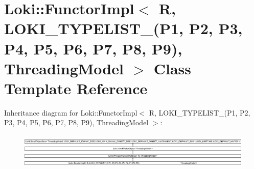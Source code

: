 \hypertarget{classLoki_1_1FunctorImpl_3_01R_00_01LOKI__TYPELIST__9_07P1_00_01P2_00_01P3_00_01P4_00_01P5_00_01493beb80705da8521e05ba7a51e552dd}{}\section{Loki\+:\+:Functor\+Impl$<$ R, L\+O\+K\+I\+\_\+\+T\+Y\+P\+E\+L\+I\+S\+T\+\_(P1, P2, P3, P4, P5, P6, P7, P8, P9), Threading\+Model $>$ Class Template Reference}
\label{classLoki_1_1FunctorImpl_3_01R_00_01LOKI__TYPELIST__9_07P1_00_01P2_00_01P3_00_01P4_00_01P5_00_01493beb80705da8521e05ba7a51e552dd}
Inheritance diagram for Loki\+:\+:Functor\+Impl$<$ R, L\+O\+K\+I\+\_\+\+T\+Y\+P\+E\+L\+I\+S\+T\+\_(P1, P2, P3, P4, P5, P6, P7, P8, P9), Threading\+Model $>$\+:\begin{figure}[H]
\begin{center}
\leavevmode
\includegraphics[height=1.751368cm]{classLoki_1_1FunctorImpl_3_01R_00_01LOKI__TYPELIST__9_07P1_00_01P2_00_01P3_00_01P4_00_01P5_00_01493beb80705da8521e05ba7a51e552dd}
\end{center}
\end{figure}
